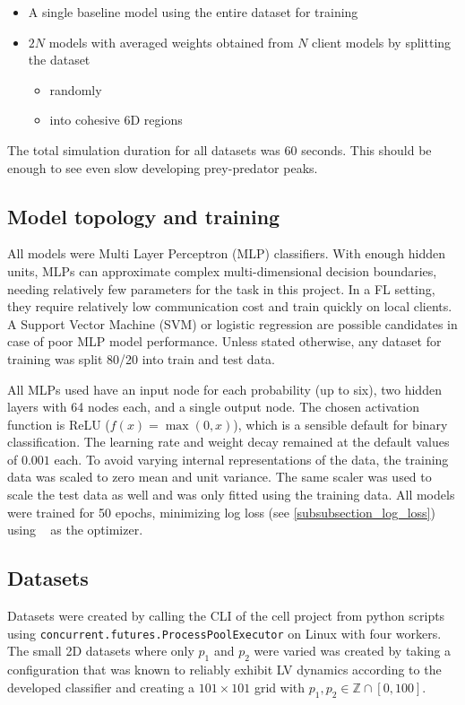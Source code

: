 \documentclass[a4paper]{scrartcl}
\begin{document}
\begin{itemize}
    \item A single baseline model using the entire dataset for training
    \item $2N$ models with averaged weights obtained from $N$ client models by splitting the dataset
    \begin{itemize}
        \item randomly
        \item into cohesive 6D regions
    \end{itemize}
\end{itemize}

The total simulation duration for all datasets was 60 seconds. This should be enough to see even slow developing prey-predator peaks.

\subsection{Model topology and training}
All models were Multi Layer Perceptron (MLP) classifiers. With enough hidden units, MLPs can approximate complex multi-dimensional decision boundaries, needing relatively few parameters for the task in this project. In a FL setting, they require relatively low communication cost and train quickly on local clients. A Support Vector Machine (SVM) or logistic regression are possible candidates in case of poor MLP model performance. Unless stated otherwise, any dataset for training was split 80/20 into train and test data.

All MLPs used have an input node for each probability (up to six), two hidden layers with 64 nodes each, and a single output node. The chosen activation function is ReLU ($f(x) = \max(0, x)$), which is a sensible default for binary classification. The learning rate and weight decay remained at the default values of $0.001$ each. To avoid varying internal representations of the data, the training data was scaled to zero mean and unit variance. The same scaler was used to scale the test data as well and was only fitted using the training data. All models were trained for 50 epochs, minimizing log loss (see \cref{subsubsection_log_loss}) using ~\cite{adam} as the optimizer.

\subsection{Datasets}
Datasets were created by calling the CLI of the cell project from python scripts using \texttt{concurrent.futures.ProcessPoolExecutor} on Linux with four workers. The small 2D datasets where only $p_1$ and $p_2$ were varied was created by taking a configuration that was known to reliably exhibit LV dynamics according to the developed classifier and creating a $101 \times 101$ grid with $p_1, p_2 \in \mathbb{Z} \cap [0, 100]$.
\end{document}
